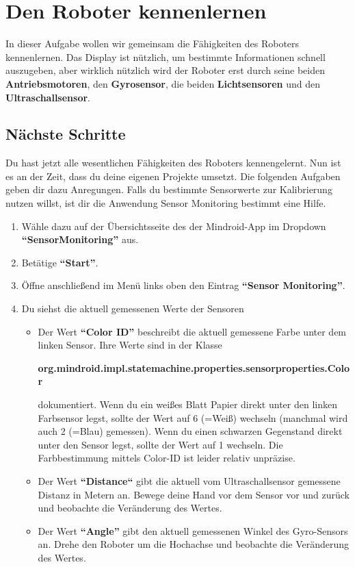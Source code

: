 \documentclass[
	12pt,
	colorbacktitle,
	accentcolor=tud1c,
	german
]{tuddesign/tudexercise}
\begin{document}
	
	
	
	
	
	
	
	
	
	
	\newpage
	
	
	\section{Den Roboter kennenlernen}
	In dieser Aufgabe wollen wir gemeinsam die Fähigkeiten des Roboters kennenlernen. Das Display ist nützlich, um bestimmte Informationen schnell auszugeben, aber wirklich nützlich wird der Roboter erst durch seine beiden \textbf{Antriebsmotoren}, den \textbf{Gyrosensor}, die beiden \textbf{Lichtsensoren} und den \textbf{Ultraschallsensor}.
	
	
	
	\subsection{Nächste Schritte}
	Du hast jetzt alle wesentlichen Fähigkeiten des Roboters kennengelernt. Nun ist es an der Zeit, dass du deine eigenen Projekte umsetzt. Die folgenden Aufgaben geben dir dazu Anregungen.
	Falls du bestimmte Sensorwerte zur Kalibrierung nutzen willst, ist dir die Anwendung Sensor Monitoring bestimmt eine Hilfe.
	\begin{enumerate}
	\item Wähle dazu auf der Übersichtsseite des der Mindroid-App im Dropdown \textbf{“SensorMonitoring” }aus.
	\item Betätige \textbf{“Start”}.
	\item Öffne anschließend im Menü links oben den Eintrag \textbf{“Sensor Monitoring”}.
	\item Du siehst die aktuell gemessenen Werte der Sensoren
	\begin{itemize}
	
	\item Der Wert \textbf{“Color ID” }beschreibt die aktuell gemessene Farbe unter dem linken Sensor. Ihre Werte sind in der Klasse \begin{center} \textbf{org.mindroid.impl.statemachine.properties.sensorproperties.Color} 
	\end{center}dokumentiert. Wenn du ein weißes Blatt Papier direkt unter den linken Farbsensor legst, sollte der Wert auf 6 (=Weiß) wechseln (manchmal wird auch 2 (=Blau) gemessen). Wenn du einen schwarzen Gegenstand direkt unter den Sensor legst, sollte der Wert auf 1 wechseln. Die Farbbestimmung mittels Color-ID ist leider relativ unpräzise.
	\item Der Wert \textbf{“Distance“} gibt die aktuell vom Ultraschallsensor gemessene Distanz in Metern an. Bewege deine Hand vor dem Sensor vor und zurück und beobachte die Veränderung des Wertes.
	\item Der Wert \textbf{“Angle” }gibt den aktuell gemessenen Winkel des Gyro-Sensors an. Drehe den Roboter um die Hochachse und beobachte die Veränderung des Wertes.
	\end{itemize}
	\end{enumerate}
\end{document}
